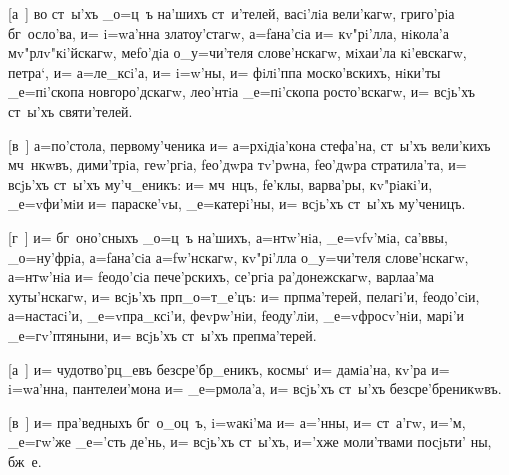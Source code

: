 [а~]  во ст~ы'хъ _о=ц~ъ на'шихъ ст~и'телей, 
васi'лiа вели'кагw, григо'рiа бг~осло'ва, и= i=wа'нна 
златоу'стагw, а=fана'сiа и= кv"рi'лла, нiкола'а 
мv"рлv"кi'йскагw, меfо'дiа о_у=чи'теля слове'нскагw, 
мiхаи'ла кi'евскагw, петра`, и= а=ле_ксi'а, и= i=w'ны, и= 
фiлi'ппа моско'вскихъ, нiки'ты _е=пi'скопа 
новгоро'дскагw, лео'нтiа _е=пi'скопа росто'вскагw, и= 
всjь'хъ ст~ы'хъ святи'телей.



[в~]  а=по'стола, первому'ченика и= 
а=рхiдiа'кона стефа'на, ст~ы'хъ вели'кихъ мч~нкwвъ, 
дими'трiа, геw'ргiа, fео'дwра тv'рwна, fео'дwра 
стратила'та, и= всjь'хъ ст~ы'хъ му'ч_еникъ: и= мч~нцъ, 
fе'клы, варва'ры, кv"рiакi'и, _е=vфи'мiи и= параске'vы, 
_е=катерi'ны, и= всjь'хъ ст~ы'хъ му'ченицъ.



[г~]  и= бг~оно'сныхъ _о=ц~ъ на'шихъ, 
а=нтw'нiа, _е=vfv'мiа, са'ввы, _о=ну'фрiа, а=fана'сiа 
а=fw'нскагw, кv"рi'лла о_у=чи'теля слове'нскагw, 
а=нтw'нiа и= fеодо'сiа пече'рскихъ, се'ргiа 
ра'донежскагw, варлаа'ма хуты'нскагw, и= всjь'хъ 
прп _о=т_е'цъ: и= прп ма'терей, пелагi'и, 
fеодо'сiи, а=настасi'и, _е=vпра_ксi'и, феvрw'нiи, 
fеоду'лiи, _е=vфросv'нiи, марi'и _е=гv'птяныни, и= 
всjь'хъ ст~ы'хъ преп ма'терей.



[а~]  и= чудотво'рц_евъ безсре'бр_еникъ, космы` 
и= дамiа'на, кv'ра и= i=wа'нна, пантелеи'мона и= 
_е=рмола'а, и= всjь'хъ ст~ы'хъ безсре'бреникwвъ.



[в~]  и= пра'ведныхъ бг~о_оц~ъ, i=wакi'ма и= 
а='нны, и= ст~а'гw, и='м, _е=гw'же _е='сть де'нь, и= 
всjь'хъ ст~ы'хъ, и='хже моли'твами посjьти' ны, бж~е.

